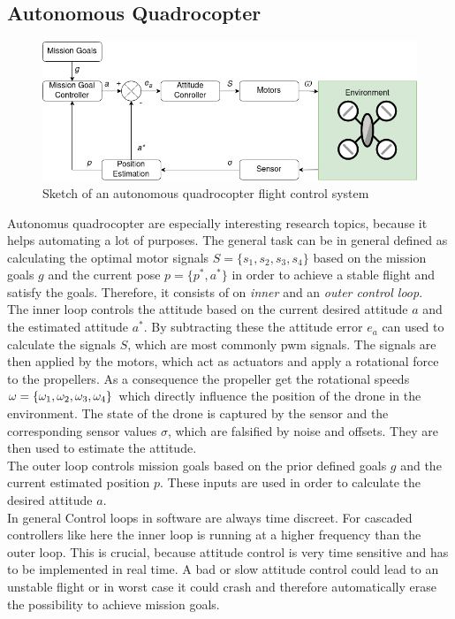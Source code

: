 \subsection{Autonomous Quadrocopter} \label{sec: autoquad}
\begin{figure}
	\centering
	\includegraphics[width=\linewidth]{figures/autoquad.png}
	\caption{Sketch of an autonomous quadrocopter flight control system}
	\label{fig:autoquad}
\end{figure}
Autonomus quadrocopter are especially interesting research topics, because it helps automating a lot of purposes. The general task can be in general defined as calculating the optimal motor signals $S = \{s_1, s_2, s_3, s_4\}$ based on the mission goals $g$ and the current pose $p = \{ p^*, a^*\}$ in order to achieve a stable flight and satisfy the goals. 
Therefore, it consists of on \emph{inner} and an \emph{outer control loop}.\\
\newline
The inner loop controls the attitude based on the current desired attitude $a$ and the estimated attitude $a^*$. By subtracting these the attitude error $e_a$ can used to calculate the signals $S$, which are most commonly pwm signals. The signals are then applied by the motors, which act as actuators and apply a rotational force to the propellers. As a consequence the propeller get the rotational speeds ${\Huge \omega } = \{ \omega_1, \omega_2, \omega_3, \omega_4 \}$ which directly influence the position of the drone in the environment. The state of the drone is captured by the sensor and the corresponding sensor values $\sigma$, which are falsified by noise and offsets. They are then used to estimate the attitude. \\
The outer loop controls mission goals based on the prior defined goals $g$ and the current estimated position $p$. These inputs are used in order to calculate the desired attitude $a$.\\
\newline
In general Control loops in software are always time discreet. For cascaded controllers like here the inner loop
is running at a higher frequency than the outer loop. This is crucial, because attitude control is very time sensitive and has to be implemented in real time. A bad or slow attitude control could lead to an unstable flight or in worst case it could crash and therefore automatically erase the possibility to achieve mission goals.\\

